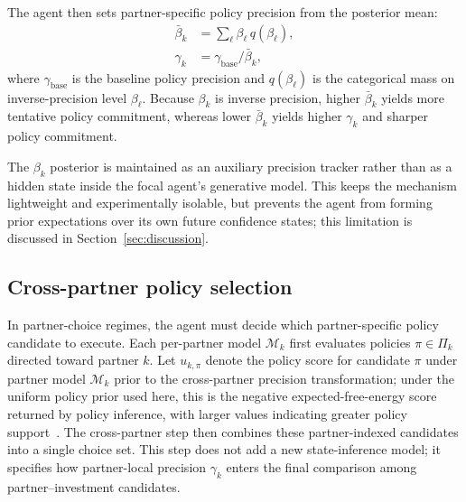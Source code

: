 The agent then sets partner-specific policy precision from the posterior mean:
\begin{equation}
\begin{aligned}
\bar{\beta}_k &= \sum_{\ell} \beta_\ell \, q(\beta_\ell), \\
\gamma_k &= \gamma_{\text{base}} / \bar{\beta}_k,
\end{aligned}
\label{eq:gamma_update}
\end{equation}
where $\gamma_{\text{base}}$ is the baseline policy precision and $q(\beta_\ell)$ is the categorical mass on inverse-precision level $\beta_\ell$. Because $\beta_k$ is inverse precision, higher $\bar{\beta}_k$ yields more tentative policy commitment, whereas lower $\bar{\beta}_k$ yields higher $\gamma_k$ and sharper policy commitment.

The $\beta_k$ posterior is maintained as an auxiliary precision tracker rather than as a hidden state inside the focal agent's generative model. This keeps the mechanism lightweight and experimentally isolable, but prevents the agent from forming prior expectations over its own future confidence states; this limitation is discussed in Section~\ref{sec:discussion}.

\subsection{Cross-partner policy selection}
\label{sec:cross_partner_policy}

In partner-choice regimes, the agent must decide which partner-specific policy candidate to execute. Each per-partner model \(\mathcal{M}_k\) first evaluates policies \(\pi \in \Pi_k\) directed toward partner \(k\). Let \(u_{k,\pi}\) denote the policy score for candidate \(\pi\) under partner model \(\mathcal{M}_k\) prior to the cross-partner precision transformation; under the uniform policy prior used here, this is the negative expected-free-energy score returned by policy inference, with larger values indicating greater policy support~\cite{Friston2017ProcessTheory,Heins2022Pymdp}. The cross-partner step then combines these partner-indexed candidates into a single choice set. This step does not add a new state-inference model; it specifies how partner-local precision \(\gamma_k\) enters the final comparison among partner--investment candidates.

